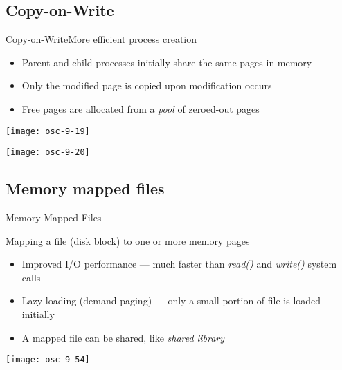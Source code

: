 \subsection{Copy-on-Write}

\begin{frame}{Copy-on-Write}{More efficient process creation}
  \begin{minipage}{.49\textwidth}
    \begin{itemize}
    \item Parent and child processes initially share the same pages in memory
    \item Only the modified page is copied upon modification occurs
    \item Free pages are allocated from a \emph{pool} of zeroed-out pages
    \end{itemize}
  \end{minipage}\hfill
  \begin{minipage}{.49\textwidth}
    \begin{center}
      \texttt{[image: osc-9-19]}
    \end{center}
    \begin{center}
      \texttt{[image: osc-9-20]}
    \end{center}
  \end{minipage}
\end{frame}

\subsection{Memory mapped files}

\begin{frame}{Memory Mapped Files}
  \begin{center}
    Mapping a file (disk block) to one or more memory pages
  \end{center}
  \begin{minipage}{.49\textwidth}
    \begin{itemize}
    \item \alert{Improved I/O performance} --- much faster than \emph{read()}
      and \emph{write()} system calls
    \item \alert{Lazy loading (demand paging)} --- only a small portion of file
      is loaded initially
    \item A mapped file can be shared, like \emph{shared library}
    \end{itemize}
  \end{minipage}\quad
  \begin{minipage}{.45\textwidth}
    \texttt{[image: osc-9-54]}
  \end{minipage}
\end{frame}

